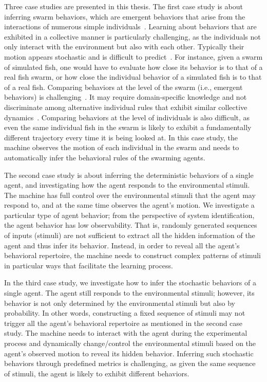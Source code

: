 Three case studies are presented in this thesis. The first case study is about inferring swarm behaviors, which are emergent behaviors that arise from the interactions of numerous simple individuals~\cite{Camazine2001}. Learning about behaviors that are exhibited in a collective manner is particularly challenging, as the individuals not only interact with the environment but also with each other. Typically their motion appears stochastic and is difficult to predict~\cite{Dirk2011}. For instance, given a swarm of simulated fish, one would have to evaluate how close its behavior is to that of a real fish swarm, or how close the individual behavior of a simulated fish is to that of a real fish. Comparing behaviors at the level of the swarm (i.e., emergent behaviors) is challenging~\cite{Harvey:SI:2015}. It may require domain-specific knowledge and not discriminate among alternative individual rules that exhibit similar collective dynamics~\cite{Weitz2012}. Comparing behaviors at the level of individuals is also difficult, as even the same individual fish in the swarm is likely to exhibit a fundamentally different trajectory every time it is being looked at. In this case study, the machine observes the motion of each individual in the swarm and needs to automatically infer the behavioral rules of the swarming agents.

The second case study is about inferring the deterministic behaviors of a single agent, and investigating how the agent responds to the environmental stimuli. The machine has full control over the environmental stimuli that the agent may respond to, and at the same time observes the agent's motion. We investigate a particular type of agent behavior; from the perspective of system identification, the agent behavior has low observability. That is, randomly generated sequences of inputs (stimuli) are not sufficient to extract all the hidden information of the agent and thus infer its behavior. Instead, in order to reveal all the agent's behavioral repertoire, the machine needs to construct complex patterns of stimuli in particular ways that facilitate the learning process. 

In the third case study, we investigate how to infer the stochastic behaviors of a single agent. The agent still responds to the environmental stimuli; however, its behavior is not only determined by the environmental stimuli but also by probability. In other words, constructing a fixed sequence of stimuli may not trigger all the agent's behavioral repertoire as mentioned in the second case study. The machine needs to interact with the agent during the experimental process and dynamically change/control the environmental stimuli based on the agent's observed motion to reveal its hidden behavior. Inferring such stochastic behaviors through predefined metrics is challenging, as given the same sequence of stimuli, the agent is likely to exhibit different behaviors. 

